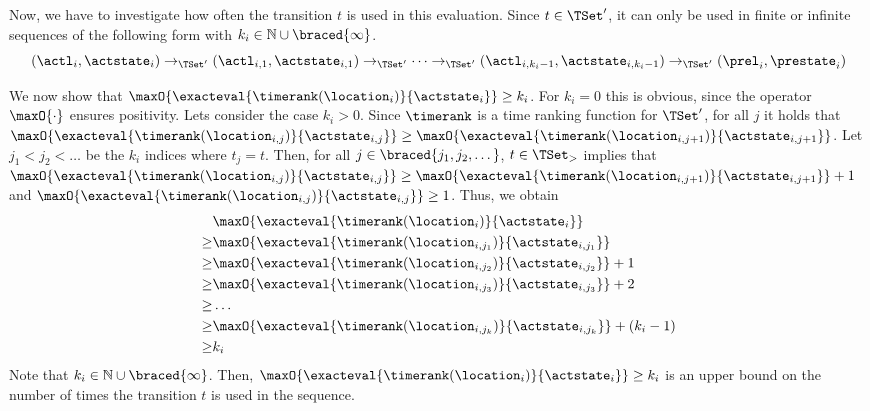 Now, we have to investigate how often the transition $t$ is used in this evaluation.
Since $t \in \TSet'$, it can only be used in finite or infinite sequences of the following form with $k_i \in \mathbb{N} \cup \braced{\infty}$.
\[ (\actl_i, \actstate_i) \rightarrow_{\TSet'} (\actl_{i,1}, \actstate_{i,1}) \rightarrow_{\TSet'} \dots \rightarrow_{\TSet'} (\actl_{i,k_i-1}, \actstate_{i,k_i-1}) \rightarrow_{\TSet'} (\prel_i, \prestate_i) \]

We now show that $\maxO{\exacteval{\timerank(\location_i)}{\actstate_i}} \geq k_i$.
For $k_i = 0$ this is obvious, since the operator $\maxO{\cdot}$ ensures positivity.
Lets consider the case $k_i > 0$.
Since $\timerank$ is a time ranking function for $\TSet'$, for all $j$ it holds that $\maxO{\exacteval{\timerank(\location_{i,j})}{\actstate_{i,j}}} \geq \maxO{\exacteval{\timerank(\location_{i,j+1})}{\actstate_{i,j+1}}}$.
Let $j_1 < j_2 < \dots$ be the $k_i$ indices where $t_j = t$.
Then, for all $j \in \braced{j_1, j_2, \dots}$, $t \in \TSet_>$ implies that $\maxO{\exacteval{\timerank(\location_{i,j})}{\actstate_{i,j}}} \geq \maxO{\exacteval{\timerank(\location_{i,j+1})}{\actstate_{i,j+1}}} + 1$ and $\maxO{\exacteval{\timerank(\location_{i,j})}{\actstate_{i,j}}} \geq 1$.
Thus, we obtain
\begin{align*}
  & \maxO{\exacteval{\timerank(\location_i)}{\actstate_i}} \\
  \geq & \maxO{\exacteval{\timerank(\location_{i,j_1})}{\actstate_{i,j_1}}} \\
  \geq & \maxO{\exacteval{\timerank(\location_{i,j_2})}{\actstate_{i,j_2}}} + 1 \\
  \geq & \maxO{\exacteval{\timerank(\location_{i,j_3})}{\actstate_{i,j_3}}} + 2 \\
  \geq & \dots \\
  \geq & \maxO{\exacteval{\timerank(\location_{i,j_k})}{\actstate_{i,j_k}}} + (k_i-1) \\
  \geq & k_i
\end{align*}
Note that $k_i \in \mathbb{N} \cup \braced{\infty}$.
Then, $\maxO{\exacteval{\timerank(\location_i)}{\actstate_i}} \geq k_i$ is an upper bound on the number of times the transition $t$ is used in the sequence.

